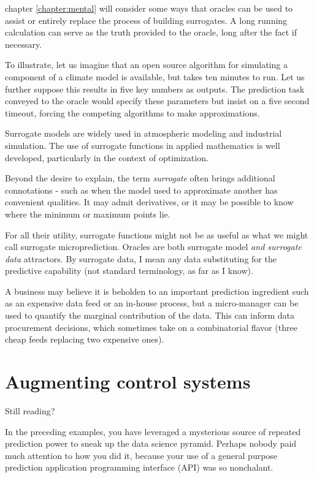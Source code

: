 chapter \ref{chapter:mental} will consider some ways that oracles can be used to assist or entirely replace the process of building surrogates. A long running calculation can serve as the truth provided to the oracle, long after the fact if necessary.

To illustrate, let us imagine that an open source algorithm for simulating a component of a climate model is available, but takes ten minutes to run. Let us further suppose this results in five key numbers as outputs. The prediction task conveyed to the oracle would specify these parameters but insist on a five second timeout, forcing the competing algorithms to make approximations. 


Surrogate models are widely used in atmospheric modeling and industrial simulation. The use of surrogate functions in applied mathematics is well developed, particularly in the context of optimization. 


Beyond the desire to explain, the term {\em surrogate} often brings additional connotations - such as when the model used to approximate another has convenient qualities. It may admit derivatives, or it may be possible to know where the minimum or maximum points lie.   


For all their utility, surrogate functions might not be as useful as what we might call surrogate microprediction. Oracles are both surrogate model {\em and surrogate data} attractors. By surrogate data, I mean any data substituting for the predictive capability (not standard terminology, as far as I know). 

A business may believe it is beholden to an important prediction ingredient such as an expensive data feed or an in-house process, but a micro-manager can be used to quantify the marginal contribution of the data. This can inform data procurement decisions, which sometimes take on a combinatorial flavor (three cheap feeds replacing two expensive ones).   


\section{Augmenting control systems} 

Still reading? 

In the preceding examples, you have leveraged a mysterious source of repeated prediction power to sneak up the data science pyramid. Perhaps nobody paid much attention to how you did it, because your use of a general purpose prediction application programming interface (API) was so nonchalant.

